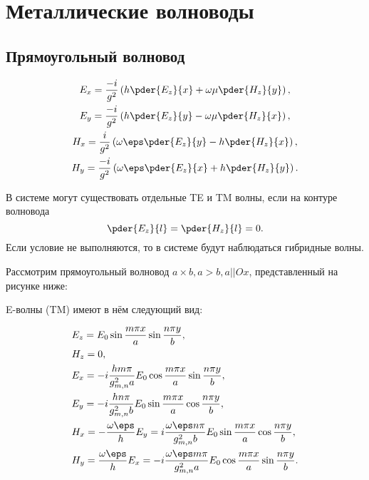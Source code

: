 \chapter{Металлические волноводы}
\section{Прямоугольный волновод}

\begin{gather*}
	E_x = \frac{-i}{g^2}\left(h\pder{E_z}{x} + \omega\mu\pder{H_z}{y}\right),\\
	E_y = \frac{-i}{g^2}\left(h\pder{E_z}{y} - \omega\mu\pder{H_z}{x}\right),\\
	H_x = \frac{i}{g^2}\left(\omega\eps\pder{E_z}{y} - h\pder{H_z}{x}\right),\\
	H_y = \frac{-i}{g^2}\left(\omega\eps\pder{E_z}{x} + h\pder{H_z}{y}\right).
\end{gather*}

В системе могут существовать отдельные TE и TM волны, если на контуре волновода
\[
	\pder{E_z}{l} = \pder{H_z}{l} = 0.
\]
Если условие не выполняются, то в системе будут наблюдаться гибридные волны.

Рассмотрим прямоугольный волновод \( a \times b, a > b, a || Ox \), представленный на рисунке ниже:

\begin{center}
\end{center}

E-волны (TM) имеют в нём следующий вид:

\begin{align*}
	& E_z = E_0\sin\frac{m\pi x}{a}\sin\frac{n\pi y}{b},\\
	& H_z = 0,\\
	& E_x = -i\frac{hm\pi}{g_{m,n}^2a}E_0\cos\frac{m\pi x}{a}\sin\frac{n\pi y}{b},\\
	& E_y = -i\frac{hn\pi}{g_{m,n}^2b}E_0\sin\frac{m\pi x}{a}\cos\frac{n\pi y}{b},\\
	& H_x = -\frac{\omega\eps}{h}E_y = i\frac{\omega\eps n\pi}{g_{m,n}^2b}E_0
	 								\sin\frac{m\pi x}{a}\cos\frac{n\pi y}{b},\\
	& H_y = \frac{\omega\eps}{h}E_x = -i\frac{\omega\eps m\pi}{g_{m,n}^2a}E_0
	 								\cos\frac{m\pi x}{a}\sin\frac{n\pi y}{b}.
\end{align*}

